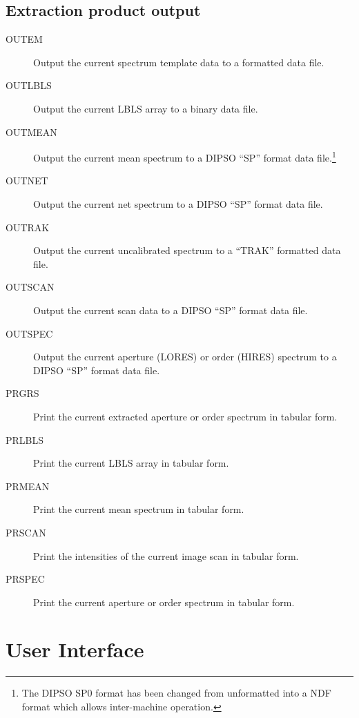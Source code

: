 \subsection {Extraction product output}

\begin {description}

\item [OUTEM] Output the current spectrum template data to a formatted
data  file.

\item [OUTLBLS] Output the current LBLS array to a binary data file.

\item [OUTMEAN] Output the current mean spectrum to a DIPSO ``SP''
format  data file.\footnote{The DIPSO SP0 format has been changed from
unformatted into a NDF format which allows inter-machine operation.}

\item [OUTNET] Output the current net spectrum to a DIPSO ``SP''
format data file. 

\item [OUTRAK] Output the current uncalibrated spectrum to a ``TRAK'' 
formatted data file. 

\item [OUTSCAN] Output the current scan data to a DIPSO ``SP'' format
data  file. 

\item [OUTSPEC] Output the current aperture (LORES) or order (HIRES)
spectrum to a DIPSO ``SP'' format data file.  

\item [PRGRS] Print the current extracted aperture or order spectrum
in tabular form.  

\item [PRLBLS] Print the current LBLS array in tabular form. 

\item [PRMEAN] Print the current mean spectrum in tabular form. 

\item [PRSCAN] Print the intensities of the current image scan in
tabular  form. 

\item [PRSPEC] Print the current aperture or order spectrum in tabular 
form. 

\end {description} 

\newpage

\section {User Interface}

